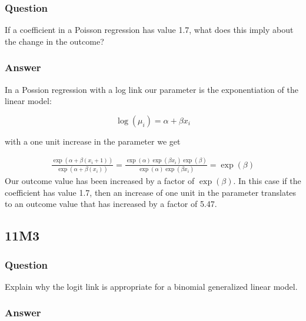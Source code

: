 \documentclass[
]{book}
\begin{document}
\hypertarget{question-86}{%
\subsubsection*{Question}\label{question-86}}

If a coefficient in a Poisson regression has value 1.7, what does this imply about the change in the outcome?

\hypertarget{answer-86}{%
\subsubsection*{Answer}\label{answer-86}}

In a Possion regression with a log link our parameter is the exponentiation of the linear model:

\[
\log(\mu_i) = \alpha + \beta x_i
\]

with a one unit increase in the parameter we get

\[
\begin{aligned}
\frac{\exp(\alpha + \beta(x_i + 1) )}{\exp(\alpha + \beta(x_i))} = \frac{\exp(\alpha) \exp(\beta x_i) \exp(\beta)}{\exp(\alpha) \exp(\beta x_i)}
 = \exp(\beta)
\end{aligned}
\]
Our outcome value has been increased by a factor of \(\exp(\beta)\). In this case if the coefficient has value 1.7, then an increase of one unit in the parameter translates to an outcome value that has increased by a factor of 5.47.

\hypertarget{m3-6}{%
\subsection*{11M3}\label{m3-6}}

\hypertarget{question-87}{%
\subsubsection*{Question}\label{question-87}}

Explain why the logit link is appropriate for a binomial generalized linear model.

\hypertarget{answer-87}{%
\subsubsection*{Answer}\label{answer-87}}
\end{document}

